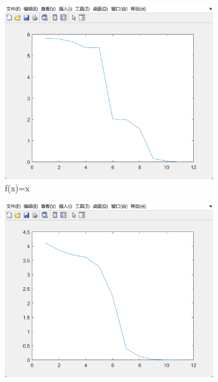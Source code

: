 \documentclass[11pt]{ctexart}
\begin{document}
    \begin{figure}[H]
        \centering
        \begin{subfigure}[t]{0.3\textwidth}
            \centering
            \includegraphics[width=\textwidth]{./picture/exp1_3_1}
            \caption{f(x)=x}
            \label{fig:a}
        \end{subfigure}
        \begin{subfigure}[t]{0.3\textwidth}
            \centering
            \includegraphics[width=\textwidth]{./picture/exp1_3_2}

\end{subfigure}
\end{figure}
\end{document}
